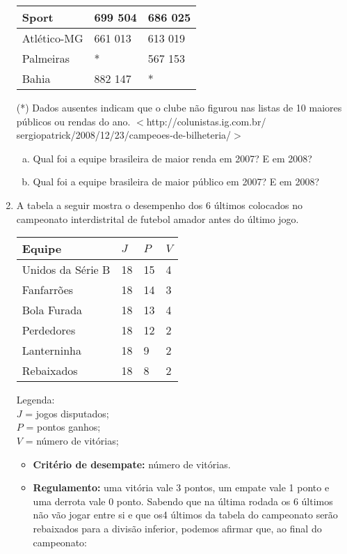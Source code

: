 \documentclass[a4paper,14pt]{article}
\begin{document}
\begin{multicols}{2}
\begin{enumerate}
\begin{table}[H]
\begin{tabular}{|p{2.6cm}|p{2.4cm}|p{2.4cm}|}
					Sport & 699 504 & 686 025 \\ \hline
					Atlético-MG & 661 013 & 613 019 \\ \hline
					Palmeiras & * & 567 153 \\ \hline
					Bahia & 882 147 & * \\ \hline
				\end{tabular}
			\end{table}
			(*) Dados ausentes indicam que o clube não figurou nas listas de 10 maiores públicos ou rendas do ano.
			$<$http://colunistas.ig.com.br/ \\ sergiopatrick/2008/12/23/campeoes-de-bilheteria/$>$
			\begin{enumerate}[a)]
				\item Qual foi a equipe brasileira de maior renda em 2007? E em 2008?
				\item Qual foi a equipe brasileira de maior público em 2007? E em 2008? \newpage
			\end{enumerate}
			\item A tabela a seguir mostra o desempenho dos 6 últimos colocados no campeonato interdistrital de futebol amador antes do último jogo.
			\begin{table}[H]
				\begin{tabular}{|p{2.8cm}|p{1.2cm}|p{1.2cm}|p{1.2cm}|}
					\hline
					\textbf{Equipe} & \textbf{$J$} & \textbf{$P$} & \textbf{$V$} \\ \hline
					Unidos da Série B   & 18   & 15 & 4  \\ \hline
					Fanfarrões   & 18   & 14 & 3  \\ \hline
					Bola Furada   & 18   & 13 & 4 \\ \hline
					Perdedores   & 18   & 12 & 2   \\ \hline
					Lanterninha   & 18  & 9 & 2   \\ \hline
					Rebaixados   & 18  & 8 & 2   \\ \hline
				\end{tabular}
			\end{table}
			Legenda: \\ \textbf{$J$} = jogos disputados; \\ \textbf{$P$} = pontos ganhos; \\ \textbf{$V$} = número de vitórias; 
			\begin{itemize}
				\item \textbf{Critério de desempate:} número de vitórias.
				\item \textbf{Regulamento:} uma vitória vale 3 pontos, um empate vale 1 ponto e uma derrota vale 0 ponto. Sabendo que na última rodada os 6 últimos não vão jogar entre si e que os4 últimos da tabela do campeonato serão rebaixados para a divisão inferior, podemos afirmar que, ao final do campeonato:

\end{itemize}
\end{enumerate}
\end{multicols}
\end{document}
